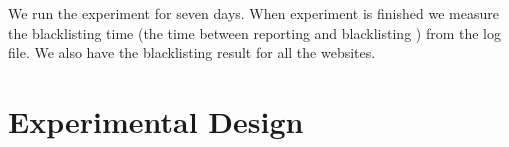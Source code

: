 \documentclass[letterpaper,twocolumn,10pt]{article}
\begin{document}
We run the experiment for seven days. When experiment is finished we measure the blacklisting time (the time between reporting and blacklisting ) from the log file. We also have the blacklisting result for all the websites.



\section{Experimental Design}




 

\end{document}
